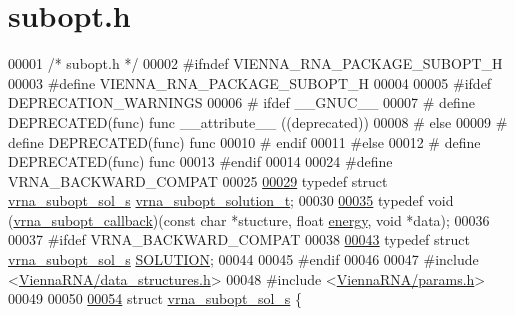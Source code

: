 \hypertarget{subopt_8h_source}{}\section{subopt.\+h}
\label{subopt_8h_source}

\begin{DoxyCode}
00001 \textcolor{comment}{/* subopt.h */}
00002 \textcolor{preprocessor}{#ifndef VIENNA\_RNA\_PACKAGE\_SUBOPT\_H}
00003 \textcolor{preprocessor}{#define VIENNA\_RNA\_PACKAGE\_SUBOPT\_H}
00004 
00005 \textcolor{preprocessor}{#ifdef DEPRECATION\_WARNINGS}
00006 \textcolor{preprocessor}{# ifdef \_\_GNUC\_\_}
00007 \textcolor{preprocessor}{#  define DEPRECATED(func) func \_\_attribute\_\_ ((deprecated))}
00008 \textcolor{preprocessor}{# else}
00009 \textcolor{preprocessor}{#  define DEPRECATED(func) func}
00010 \textcolor{preprocessor}{# endif}
00011 \textcolor{preprocessor}{#else}
00012 \textcolor{preprocessor}{# define DEPRECATED(func) func}
00013 \textcolor{preprocessor}{#endif}
00014 
00024 \textcolor{preprocessor}{#define VRNA\_BACKWARD\_COMPAT}
00025 
\hypertarget{subopt_8h_source.tex_l00029}{}\hyperlink{subopt_8h_a01ae9a0f27d245d89f705afd843fc457}{00029} \textcolor{keyword}{typedef} \textcolor{keyword}{struct }\hyperlink{structvrna__subopt__sol__s}{vrna\_subopt\_sol\_s}   \hyperlink{structvrna__subopt__sol__s}{vrna\_subopt\_solution\_t};
00030 
\hypertarget{subopt_8h_source.tex_l00035}{}\hyperlink{group__subopt__wuchty_ga226e3803a826aba8159284d021c24d01}{00035} \textcolor{keyword}{typedef} void (\hyperlink{group__subopt__wuchty_ga226e3803a826aba8159284d021c24d01}{vrna\_subopt\_callback})(\textcolor{keyword}{const} \textcolor{keywordtype}{char} *stucture, \textcolor{keywordtype}{float} 
      \hyperlink{structvrna__subopt__sol__s_a99bc26ca68392aa4656386cf73b73fef}{energy}, \textcolor{keywordtype}{void} *data);
00036 
00037 \textcolor{preprocessor}{#ifdef VRNA\_BACKWARD\_COMPAT}
00038 
\hypertarget{subopt_8h_source.tex_l00043}{}\hyperlink{subopt_8h_aa0f46ff02e1017469cf902d02ecd7f9a}{00043} \textcolor{keyword}{typedef} \textcolor{keyword}{struct }\hyperlink{structvrna__subopt__sol__s}{vrna\_subopt\_sol\_s}   \hyperlink{structvrna__subopt__sol__s}{SOLUTION};
00044 
00045 \textcolor{preprocessor}{#endif}
00046 
00047 \textcolor{preprocessor}{#include <\hyperlink{data__structures_8h}{ViennaRNA/data\_structures.h}>}
00048 \textcolor{preprocessor}{#include <\hyperlink{params_8h}{ViennaRNA/params.h}>}
00049 
00050 
\hypertarget{subopt_8h_source.tex_l00054}{}\hyperlink{structvrna__subopt__sol__s}{00054} \textcolor{keyword}{struct }\hyperlink{structvrna__subopt__sol__s}{vrna\_subopt\_sol\_s} \{

\end{DoxyCode}
